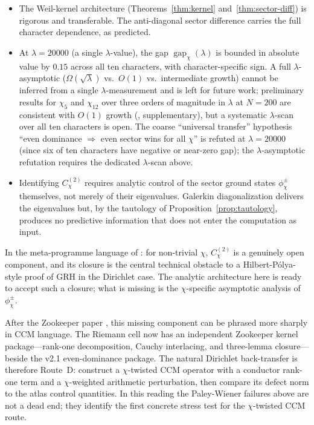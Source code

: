 \documentclass[a4paper,10pt,twocolumn]{article}
\theoremstyle{definition}
\theoremstyle{remark}
\newcommand{\gap}{\operatorname{gap}}
\newcommand{\chifn}{\chi}
\begin{document}
\begin{itemize}
  \item[(I1)] The Weil-kernel architecture (Theorems~\ref{thm:kernel}
    and~\ref{thm:sector-diff}) is rigorous and transferable. The
    anti-diagonal sector difference carries the full character
    dependence, as predicted.
  \item[(I2)] At $\lambda=20000$ (a single $\lambda$-value), the gap
    $\gap_{\chifn}(\lambda)$ is bounded in absolute value by
    $0.15$ across all ten characters, with character-specific sign.
    A full $\lambda$-asymptotic ($\Omega(\sqrt{\lambda})$ vs.\
    $O(1)$ vs.\ intermediate growth) cannot be inferred from a
    single $\lambda$-measurement and is left for future work;
    preliminary results for $\chifn_5$ and $\chifn_{12}$ over three
    orders of magnitude in $\lambda$ at $N=200$ are consistent
    with $O(1)$ growth (\cite{AsymptoticScan}, supplementary), but
    a systematic $\lambda$-scan over all ten characters is open.
    The coarse ``universal transfer'' hypothesis ``even dominance
    $\Rightarrow$ even sector wins for all $\chifn$'' is refuted
    at $\lambda=20000$ (since six of ten characters have negative
    or near-zero gap); the $\lambda$-asymptotic refutation requires
    the dedicated $\lambda$-scan above.
  \item[(I3)] Identifying $C^{(2)}_{\chifn}$ requires analytic
    control of the sector ground states $\phi^\pm_{\chifn}$
    themselves, not merely of their eigenvalues. Galerkin
    diagonalization delivers the eigenvalues but, by the tautology
    of Proposition~\ref{prop:tautology}, produces no predictive
    information that does not enter the computation as input.
\end{itemize}

In the meta-programme language of \cite{MetaGalerkinBridge}: for
non-trivial $\chifn$, $C^{(2)}_{\chifn}$ is a genuinely open
component, and its closure is the central technical obstacle to a
Hilbert-P\'olya-style proof of GRH in the Dirichlet case. The
analytic architecture here is ready to accept such a closure; what
is missing is the $\chifn$-specific asymptotic analysis of
$\phi^\pm_{\chifn}$.

After the Zookeeper paper \cite{Zookeeper2026}, this missing
component can be phrased more sharply in CCM language. The Riemann
cell now has an independent Zookeeper kernel package---rank-one
decomposition, Cauchy interlacing, and three-lemma closure---beside
the v2.1 even-dominance package. The natural Dirichlet back-transfer
is therefore Route~D: construct a $\chifn$-twisted CCM operator with
a conductor rank-one term and a $\chifn$-weighted arithmetic
perturbation, then compare its defect norm to the atlas control
quantities. In this reading the Paley-Wiener failures above are not a
dead end; they identify the first concrete stress test for the
$\chifn$-twisted CCM route.
\end{document}
